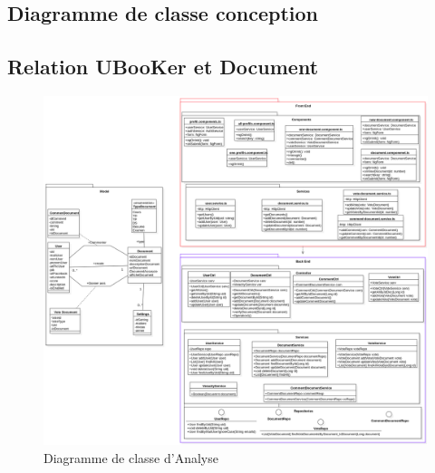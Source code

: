 \documentclass[12pt]{report}
\begin{document}
\begin{landscape}
\section{Diagramme de classe conception}
\subsection{Relation UBooKer et Document}
\begin{figure}[hbtp]
    \centering
    \includegraphics[width=.9\textwidth]{Diagramme de Classe Conception pour les documents}
    \caption{Diagramme de classe d'Analyse}
    \label{fig:classe analyse 1}
\end{figure}
\end{landscape}
\restoregeometry
\end{document}
